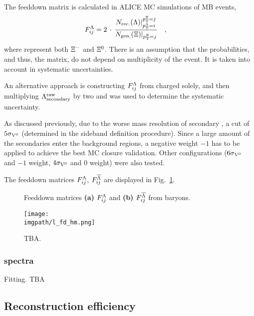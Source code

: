 The feeddown matrix is calculated in ALICE MC simulations of MB events,
\begin{align}
F_{ij}^\Lambda &= 2 \, \cdot \, \frac{N_\mathrm{rec.} (\Lambda) |_{p_{\text{T}}^\Lambda = i}^{p_{\text{T}}^{\Xi} = j}}{N_\mathrm{gen.} (\Xi) |_{p_{\text{T}}^{\Xi} = j}} \quad ,
\end{align}
where \XI represent both $\Xi^-$ and $\Xi^0$. There is an assumption that the probabilities, and thus, the matrix, do not depend on multiplicity of the event. It is taken into account in systematic uncertainties.

An alternative approach is constructing $F_{ij}^\Lambda$ from charged \XI solely, and then multiplying $\Lambda^\mathrm{raw}_\mathrm{secondary}$ by two and was used to determine the systematic uncertainty.

As discussed previously, due to the worse mass resolution of secondary \LA, a \Minv cut of $5\sigma_{\rm V^0}$ (determined in the sideband definition procedure). Since a large amount of the secondaries enter the background regions, a negative weight $-1$ has to be applied to achieve the best MC closure validation. Other configurations ($6\sigma_{\rm V^0}$ and $-1$ weight, $4\sigma_{\rm V^0}$ and $0$ weight) were also tested.

The feeddown matrices $F_{ij}^{\Lambda}$, $F_{ij}^{\overline{\Lambda}}$ are displayed in Fig.~\ref{fig:analysis:fdmatrix}.

\begin{figure}%
%
%
\caption{Feeddown matrices \textbf{(a)} $F_{ij}^{\Lambda}$ and \textbf{(b)} $F_{ij}^{\overline{\Lambda}}$ from \XI baryons.}%
\label{fig:analysis:fdmatrix}%
\end{figure}

\begin{figure}%
\texttt{[image: \\imgpath/l\_fd\_hm.png]}%
\caption{TBA.}%
\label{fig:analysis:fdfraction}%
\end{figure}

\subsubsection*{\XI spectra}

Fitting. TBA

\subsection{Reconstruction efficiency}

